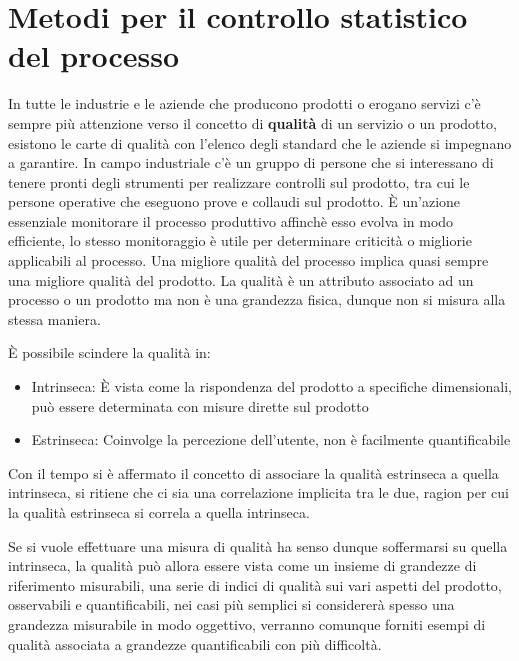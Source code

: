 \chapter{Metodi per il controllo statistico del processo}

In tutte le industrie e le aziende che producono prodotti o erogano servizi 
c'è sempre più attenzione verso il concetto di \textbf{qualità} di un servizio
o un prodotto, esistono le carte di qualità con l'elenco degli standard che le 
aziende si impegnano a garantire. In campo industriale c'è un gruppo di persone 
che si interessano di tenere pronti degli strumenti per realizzare controlli 
sul prodotto, tra cui le persone operative che eseguono prove e collaudi sul 
prodotto. È un'azione essenziale monitorare il processo produttivo affinchè 
esso evolva in modo efficiente, lo stesso monitoraggio è utile per determinare 
criticità o migliorie applicabili al processo.
Una migliore qualità del processo implica quasi sempre una migliore qualità del 
prodotto.
La qualità è un attributo associato ad un processo o un prodotto ma non è una 
grandezza fisica, dunque non si misura alla stessa maniera.

È possibile scindere la qualità in:
\begin{itemize}
    \item Intrinseca: È vista come la rispondenza del prodotto a specifiche 
    dimensionali, può essere determinata con misure dirette sul prodotto
    \item Estrinseca: Coinvolge la percezione dell'utente, non è facilmente 
    quantificabile
\end{itemize}
Con il tempo si è affermato il concetto di associare la qualità estrinseca a 
quella intrinseca, si ritiene che ci sia una correlazione implicita tra le due, 
ragion per cui la qualità estrinseca si correla a quella intrinseca.

Se si vuole effettuare una misura di qualità ha senso dunque soffermarsi su 
quella intrinseca, la qualità può allora essere vista come un insieme di 
grandezze di riferimento misurabili, una serie di indici di qualità sui vari 
aspetti del prodotto, osservabili e quantificabili, nei casi più semplici si 
considererà spesso una grandezza misurabile in modo oggettivo, verranno 
comunque forniti esempi di qualità associata a grandezze quantificabili con più 
difficoltà.

